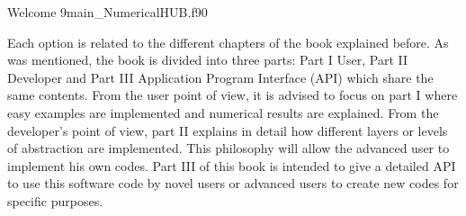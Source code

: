 
\vspace{0.5cm}
       {Welcome}
       {9}{main_NumericalHUB.f90}




Each option is related to the different chapters of the book explained before. 
As was mentioned, the book is divided into three parts: Part I User, Part II Developer and Part III Application Program Interface (API) which share the same contents. 
From the user point of view, it is advised to focus on part I where easy examples are implemented and numerical results are explained.
From the developer's point of view, part II explains in detail how different layers or levels of abstraction are implemented. This philosophy
will allow the advanced user to implement his own codes. 
Part III of this book is intended to give a detailed API to use this software code by novel users or advanced users to create new codes
for specific purposes. 





